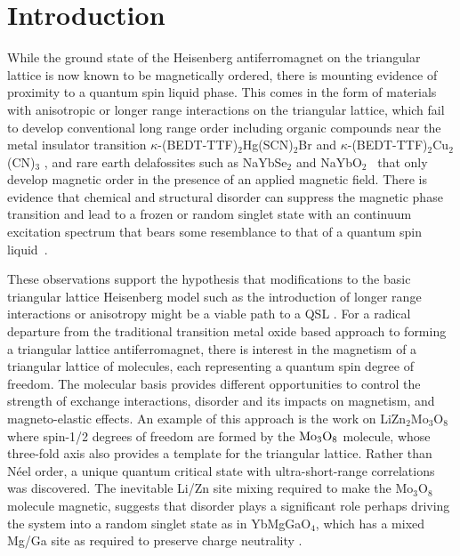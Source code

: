 \documentclass[%
 reprint,
superscriptaddress,
 amsmath,amssymb,
 aps,
 prb,
]{revtex4-2}
\begin{document}
\maketitle


\section{\label{sec:level1}Introduction\protect}
While the ground state of the Heisenberg antiferromagnet on the triangular lattice is now known to be magnetically ordered\cite{Capriotti1999Long-rangeModel,Shirata2012ExperimentalAntiferromagnet}, there is mounting evidence of proximity to a quantum spin liquid phase. This comes in the form of materials with anisotropic or longer range interactions on the triangular lattice, which fail to develop conventional long range order including organic compounds near the metal insulator transition $\kappa$-(BEDT-TTF)$_2$Hg(SCN)$_2$Br\cite{Hassan2018EvidenceMaterial} and $\kappa$-(BEDT-TTF)$_2$Cu$_2$(CN)$_3$ \cite{Shimizu2003SpinLattice,Yamashita2008ThermodynamicSalt,Isono2016Quantum-BEDT-TTF2Cu2CN3}, and rare earth delafossites such as  NaYbSe$_2$\cite{Ranjith2019AnisotropicNaYbSe2,Dai2020SpinonNaYbSe_2} and NaYbO$_2$~\cite{Lei2019_NaYbO2,Bordelon_2020_NaYbO2} that only develop magnetic order in the presence of an applied magnetic field. There is evidence that chemical and structural disorder can suppress the magnetic phase transition and lead to a frozen or random singlet state with an continuum excitation spectrum that bears some resemblance to that of a quantum spin liquid~\cite{ZhenDong_2021_YZGO,Binder1986_spinglass,Zhenyue2017_ymgo}.

These observations support the hypothesis that modifications to the basic triangular lattice Heisenberg model such as the introduction of longer range interactions or anisotropy might be a viable path to a QSL \cite{Zhu2015SpinLattice,Hu2015CompetingLattice}. For a radical departure from the traditional transition metal oxide based approach to forming a triangular lattice antiferromagnet, there is interest in the magnetism of a triangular lattice of molecules, each representing a quantum spin degree of freedom. The molecular basis provides different opportunities to control the strength of exchange interactions, disorder and its impacts on magnetism, and magneto-elastic effects. An example of this approach is the work on LiZn$_2$Mo$_3$O$_8$ \cite{Sheckelton2012PossibleO8,Mourigal2014Molecular8,Sheckelton2014LocalO8} where spin-1/2 degrees of freedom are formed by the $\rm Mo_3O_8$ molecule, whose three-fold axis also provides a template for the triangular lattice. Rather than N\'{e}el order, a unique quantum critical state with ultra-short-range correlations was discovered. The inevitable  Li/Zn site mixing required to make the Mo$_3$O$_8$ molecule magnetic, suggests that disorder plays a significant role perhaps driving the system into a random singlet state as in YbMgGaO$_4$, which has a mixed Mg/Ga site as required to preserve charge neutrality \cite{Rao2021_ymgo,Zhenyue2017_ymgo}. 
\end{document}
